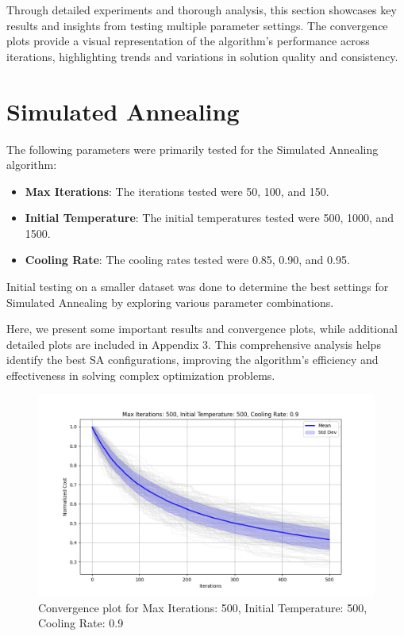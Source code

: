\documentclass[
]{article}
\begin{document}
    Through detailed experiments and thorough analysis, this section showcases key results and insights from testing multiple parameter settings.
    The convergence plots provide a visual representation of the algorithm’s performance across iterations, highlighting trends and variations in solution quality and consistency.


    \section{Simulated Annealing}

    The following parameters were primarily tested for the Simulated Annealing algorithm:

    \begin{itemize}
        \item \textbf{Max Iterations}: The iterations tested were 50, 100, and 150.
        \item \textbf{Initial Temperature}: The initial temperatures tested were 500, 1000, and 1500.
        \item \textbf{Cooling Rate}: The cooling rates tested were 0.85, 0.90, and 0.95.
    \end{itemize}

    Initial testing on a smaller dataset was done to determine the best settings for Simulated Annealing by exploring various parameter combinations.


    Here, we present some important results and convergence plots, while additional detailed plots are included in Appendix 3.
    This comprehensive analysis helps identify the best SA configurations, improving the algorithm’s efficiency and effectiveness in solving complex optimization problems.

    \begin{figure}[H]
        \centering
        \includegraphics[width=\textwidth]{simulated_annealing/max_iter_500_init_temp_500_cooling_rate_0.9}
        \caption{Convergence plot for Max Iterations: 500, Initial Temperature: 500, Cooling Rate: 0.9}
        \label{fig:sa_500_500_0.9}
    \end{figure}
\end{document}
